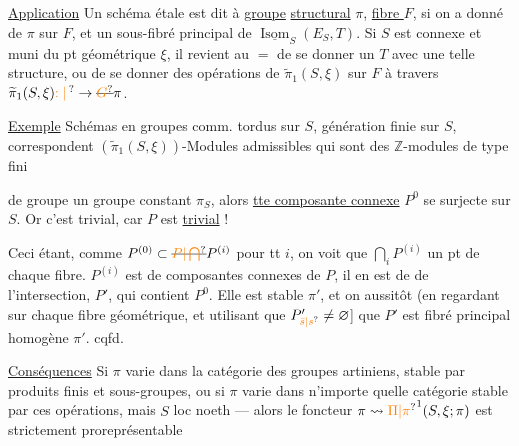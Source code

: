 \uline{Application} Un schéma étale  est dit à \uline{groupe}
\uline{structural} $\pi$, \uline{fibre $F$}, si on a
donné  de $\pi$ sur $F$,
et un sous-fibré  principal de
$\underline{\operatorname{Isom}}_S(E_S,T)$. Si $S$ est connexe et
muni du pt géométrique $\xi$, il revient
au $=$ de se donner un $T$ avec
une telle structure, ou de se
donner des opérations 
de $\widetilde{\pi}_1(S,\xi)$  sur $F$ à
travers $\widetilde{\pi}_1(S,\xi)\unsure{:|\,}\to\deleted{\unsure{G}}\pi$.

\uline{Exemple} Schémas en groupes comm.
 tordus sur $S$,  
génération finie sur $S$, correspondent
 $(\widetilde{\pi}_1(S,\xi))$-Modules admissibles
 qui sont des $\mathbb Z$-modules
de type fini \unsure{---}

de groupe un groupe constant $\pi_S$, alors
\uline{tte composante connexe} $P^0$ se surjecte sur $S$.
Or c'est trivial, car $P$ est \uline{trivial} !

Ceci étant, comme $P^{(0)}\subset\deleted{\unsure{P|\bigcap}}P^{(i)}$ pour tt $i$,
on voit que $\bigcap_i P^{(i)}$  un pt
de chaque fibre. 
  $P^{(i)}$ est  de
composantes connexes de $P$, il en est de
 de l'intersection,  $P'$, qui contient
$P^0$. Elle est stable  $\pi'$, et on 
aussitôt (en regardant sur chaque fibre
géométrique, et utilisant que $P'_{\unsure{\bar s|s}}\ne\varnothing$]
que $P'$ est fibré principal homogène  $\pi'$.
cqfd.

\uline{Conséquences} Si $\pi$ varie dans la  catégorie
des groupes artiniens, 
stable par produits finis et sous-groupes,
ou si $\pi$ varie dans n'importe quelle
catégorie stable par ces opérations, mais $S$
 loc noeth --- alors le foncteur
$\pi\leadsto\unsure{\Pi|\pi}^{1}(S,\xi;\pi)$ est strictement proreprésentable\unsure{$^{*}$|/}


